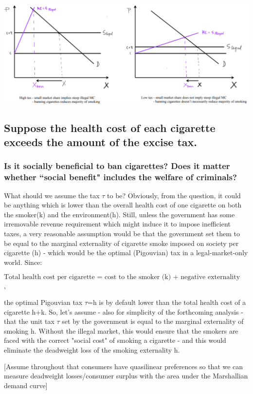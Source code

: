 \documentclass{article}
\begin{document}
\includegraphics[width=.9\textwidth]{Graph2.png}


\subsection{Suppose the health cost of each cigarette exceeds the
  amount of the excise tax.}
\subsubsection{Is it socially beneficial to ban cigarettes? Does it
  matter whether ``social benefit" includes the welfare of criminals?}

What should we assume the tax $\tau$ to be? Obviously, from the question,
it could be anything which is lower than the overall health cost of
one cigarette on both the smoker(k) and the environment(h). Still,
unless the government has some irremovable revenue requirement which
might induce it to impose inefficient taxes, a very reasonable
assumption would be that the government set them to be equal to the
marginal externality of cigarette smoke imposed on society per
cigarette (h) - which would be the optimal (Pigouvian) tax in a
legal-market-only world. Since:

$$\text{Total health cost per cigarette = cost to the smoker (k) + negative externality (h)}$$,

the optimal Pigouvian tax $\tau$=h is by default lower than the total
health cost of a cigarette h+k. So, let's assume - also for simplicity
of the forthcoming analysis - that the unit tax $\tau$ set by the
government is equal to the marginal externality of smoking h. Without
the illegal market, this would ensure that the smokers are faced with
the correct "social cost" of smoking a cigarette - and this would
eliminate the deadweight loss of the smoking externality h.

[Assume throughout that consumers have quasilinear preferences so that
we can measure deadweight losses/consumer surplus with the area under
the Marshallian demand curve]
\end{document}
